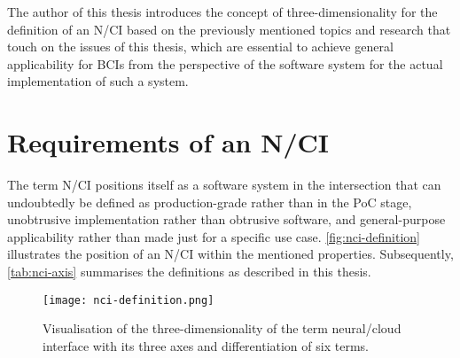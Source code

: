 The author of this thesis introduces the concept of three-dimensionality for the definition of an N/CI based on the previously mentioned topics and research that touch on the issues of this thesis, which are essential to achieve general applicability for BCIs from the perspective of the software system for the actual implementation of such a system.

\section*{Requirements of an N/CI}
\label{appendix1-requirements-of-an-nci}

The term N/CI positions itself as a software system in the intersection that can undoubtedly be defined as production-grade rather than in the PoC stage, unobtrusive implementation rather than obtrusive software, and general-purpose applicability rather than made just for a specific use case. \autoref{fig:nci-definition} illustrates the position of an N/CI within the mentioned properties. Subsequently, \autoref{tab:nci-axis} summarises the definitions as described in this thesis.

\captionsetup[figure]{list=no}

\begin{figure}[ht]
  \centering
  \texttt{[image: nci-definition.png]}
  \caption{Visualisation of the three-dimensionality of the term neural/cloud interface with its three axes and differentiation of six terms.}
  \label{fig:nci-definition}
\end{figure}

\captionsetup[figure]{list=yes}


